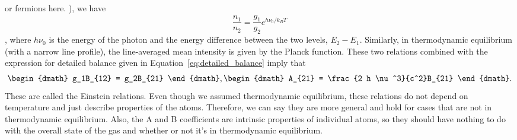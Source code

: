 \begin{enumerate}
{        or fermions here.
      }), we have
       \begin{dmath}
        \frac{n_1}{n_2} = \frac{g_1}{g_2} e^{h\nu_0 / k_B T}
       \end{dmath},
       where $h\nu_0$ is the energy of the photon and the energy difference between the two levels,
       $E_2 - E_1$.  Similarly, in thermodynamic equilibrium (with a narrow line profile), the
       line-averaged mean intensity is given by the Planck function.  These two relations combined with the expression for detailed balance given
       in Equation~\ref{eq:detailed_balance} imply that
       \begin{dgroup}
       \begin{dmath}
        g_1B_{12} = g_2B_{21}
       \end{dmath},
       \begin{dmath}
        A_{21} = \frac{2 h \nu^3}{c^2}B_{21}
       \end{dmath}.
       \end{dgroup}
       These are called the Einstein relations.
      Even though we assumed thermodynamic equilibrium, these relations do not depend on temperature and just describe properties of the atoms. Therefore, we can say they are more general and hold for cases that are not in thermodynamic equilibrium.
      Also, the A and B coefficients are intrinsic properties of individual 
      atoms, so they should have nothing to do with the overall state of the 
      gas and whether or not it's in thermodynamic equilibrium.


\end{enumerate}

